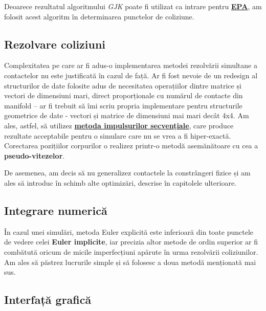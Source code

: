 \documentclass[12pt,a4paper]{report}
\begin{document}
Deoarece rezultatul algoritmului \textit{GJK} poate fi utilizat ca intrare pentru \hyperref[epa]{\textbf{EPA}}, am folosit acest algoritm în determinarea punctelor de coliziune.

\subsection{Rezolvare coliziuni}

Complexitatea pe care ar fi adus-o implementarea metodei rezolvării simultane a contactelor nu este justificată în cazul de față. Ar fi fost nevoie de un redesign al structurilor de date folosite adus de necesitatea operațiilor dintre matrice și vectori de dimensiuni mari, direct proporționale cu numărul de contacte din manifold -- ar fi trebuit să îmi scriu propria implementare pentru structurile geometrice de date - vectori și matrice de dimensiuni mai mari decât 4x4. Am ales, astfel, să utilizez \hyperref[seq_impulse_method]{\textbf{metoda impulsurilor secvențiale}}, care produce rezultate acceptabile pentru o simulare care nu se vrea a fi hiper-exactă. Corectarea pozițiilor corpurilor o realizez printr-o metodă asemănătoare cu cea a \textbf{pseudo-vitezelor}.

De asemenea, am decis să nu generalizez contactele la constrângeri fizice și am ales să introduc în schimb alte optimizări, descrise în capitolele ulterioare.

\subsection{Integrare numerică}

În cazul unei simulări, metoda Euler explicită este inferioară din toate punctele de vedere celei \textbf{Euler implicite}, iar precizia altor metode de ordin superior ar fi combătută oricum de micile imperfecțiuni apărute în urma rezolvării coliziunilor. Am ales să păstrez lucrurile simple și să folosesc a doua metodă menționată mai sus.

\subsection{Interfață grafică}
\end{document}
